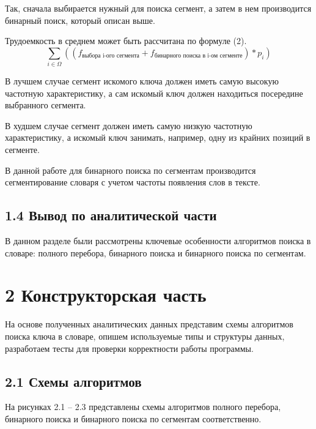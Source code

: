 \documentclass[12pt, a4paper]{report}
\begin{document}
	Так, сначала выбирается нужный для поиска сегмент, а затем в нем производится бинарный поиск, который описан выше.
	
	Трудоемкость в среднем может быть рассчитана по формуле (2).
	\begin{equation}
		\sum_{i\in\Omega} ((f_{\text{выбора i-ого сегмента}} + f_{\text{бинарного поиска в i-ом сегменте}}) * p_i) 
	\end{equation}
	
	В лучшем случае сегмент искомого ключа должен иметь самую высокую частотную характеристику, а сам искомый ключ должен находиться посередине выбранного сегмента.
	
	В худшем случае сегмент должен иметь самую низкую частотную характеристику, а искомый ключ занимать, например, одну из крайних позиций в сегменте.
	
	В данной работе для бинарного поиска по сегментам производится сегментирование словаря с учетом частоты появления слов в тексте.
	
	\section*{1.4 Вывод по аналитической части}
	В данном разделе были рассмотрены ключевые особенности алгоритмов поиска в словаре: полного перебора, бинарного поиска и бинарного поиска по сегментам.
	
	\newpage
	\chapter*{2 Конструкторская часть}
	
	На основе полученных аналитических данных представим схемы алгоритмов поиска ключа в словаре, опишем используемые типы и структуры данных, разработаем тесты для проверки корректности работы программы.
	
	\section*{2.1 Схемы алгоритмов}
	
	На рисунках 2.1 -- 2.3 представлены схемы алгоритмов полного перебора, бинарного поиска и бинарного поиска по сегментам соответственно.
	
\end{document}
